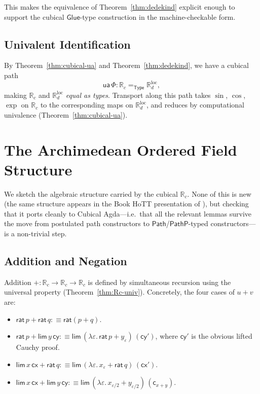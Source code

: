 \documentclass[12pt]{article}
\theoremstyle{definition}
\theoremstyle{remark}
\newcommand{\Type}{\mathsf{Type}}
\newcommand{\Rc}{\mathbb{R}_{c}}
\newcommand{\Rd}{\mathbb{R}_{d}}
\newcommand{\ua}{\mathsf{ua}}
\newcommand{\Path}{\mathsf{Path}}
\newcommand{\PathP}{\mathsf{PathP}}
\newcommand{\rat}{\mathsf{rat}}
\newcommand{\hlim}{\mathsf{lim}}
\newcommand{\Glue}{\mathsf{Glue}}
\begin{document}
This makes the equivalence of Theorem~\ref{thm:dedekind} explicit
enough to support the cubical $\Glue$-type construction in the
machine-checkable form.

\subsection{Univalent Identification}

By Theorem~\ref{thm:cubical-ua} and Theorem~\ref{thm:dedekind}, we have a
cubical path
\[
\ua\,\Phi : \Rc =_{\Type} \Rd^{\text{loc}},
\]
making $\Rc$ and $\Rd^{\text{loc}}$ \emph{equal as types}. Transport
along this path takes $\sin$, $\cos$, $\exp$ on $\Rc$ to the
corresponding maps on $\Rd^{\text{loc}}$, and reduces by computational
univalence (Theorem~\ref{thm:cubical-ua}).

\section{The Archimedean Ordered Field Structure}
\label{sec:field}

We sketch the algebraic structure carried by the cubical $\Rc$. None of
this is new (the same structure appears in the Book HoTT presentation
of \cite[\S 11.3]{HoTTBook}), but checking that it ports cleanly to
Cubical Agda---i.e.\ that all the relevant lemmas survive the move
from postulated path constructors to $\Path$/$\PathP$-typed
constructors---is a non-trivial step.

\subsection{Addition and Negation}

Addition $+ : \Rc \to \Rc \to \Rc$ is defined by simultaneous
recursion using the universal property
(Theorem~\ref{thm:Rc-univ}). Concretely, the four cases of
$u + v$ are:

\begin{itemize}
\item $\rat\,p + \rat\,q :\equiv \rat(p + q)$.
\item $\rat\,p + \hlim\,y\,\mathsf{cy} :\equiv \hlim\,(\lambda \varepsilon.\, \rat\,p + y_\varepsilon)\,(\mathsf{cy}')$, where $\mathsf{cy}'$ is the obvious lifted Cauchy proof.
\item $\hlim\,x\,\mathsf{cx} + \rat\,q :\equiv \hlim\,(\lambda \varepsilon.\, x_\varepsilon + \rat\,q)\,(\mathsf{cx}')$.
\item $\hlim\,x\,\mathsf{cx} + \hlim\,y\,\mathsf{cy} :\equiv \hlim\,(\lambda \varepsilon.\, x_{\varepsilon/2} + y_{\varepsilon/2})\,(\mathsf{c}_{x+y})$.
\end{itemize}
\end{document}

